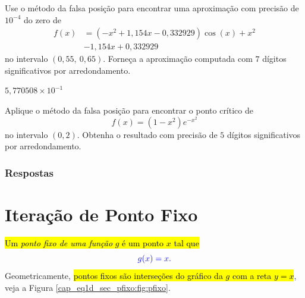 \begin{exer}
  Use o método da falsa posição para encontrar uma aproximação com precisão de $10^{-4}$ do zero de
  \begin{equation}
    \begin{aligned}
      f(x) &= (-x^2+1,154x-0,332929)\cos(x) + x^2 \\
           &- 1,154x + 0,332929
    \end{aligned}
\end{equation}
no intervalo $(0,55, ~0,65)$. Forneça a aproximação computada com $7$ dígitos significativos por arredondamento.
\end{exer}
\begin{resp}
  $5,770508\times 10^{-1}$
\end{resp}

\begin{exer}
  Aplique o método da falsa posição para encontrar o ponto crítico de
  \begin{equation}
    f(x) = (1-x^2)e^{-x^2}
  \end{equation}
  no intervalo $(0, 2)$. Obtenha o resultado com precisão de $5$ dígitos significativos por arredondamento.
\end{exer}

\ifisbook
\subsubsection{Respostas}
\shipoutAnswer
\fi


\section{Iteração de Ponto Fixo}\label{cap_eq1d_sec_pfixo}

\hl{Um \emph{ponto fixo de uma função} $g$ é um ponto $x$ tal que}
\begin{equation}\color{blue}g(x) = x.
\end{equation}
Geometricamente, \hl{pontos fixos são interseções do gráfico da $g$ com a reta $y=x$}, veja a Figura \ref{cap_eq1d_sec_pfixo:fig:pfixo}.


